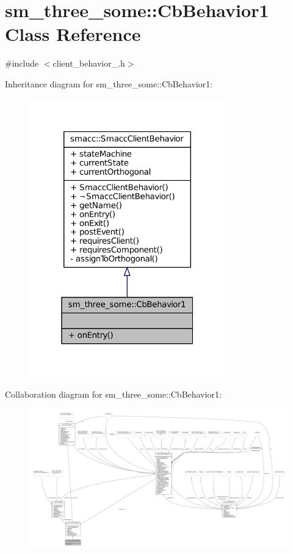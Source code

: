 \hypertarget{classsm__three__some_1_1CbBehavior1}{}\section{sm\+\_\+three\+\_\+some\+:\+:Cb\+Behavior1 Class Reference}
\label{classsm__three__some_1_1CbBehavior1}


{\ttfamily \#include $<$client\+\_\+behavior\+\_.\+h$>$}



Inheritance diagram for sm\+\_\+three\+\_\+some\+:\+:Cb\+Behavior1\+:
\nopagebreak
\begin{figure}[H]
\begin{center}
\leavevmode
\includegraphics[width=241pt]{classsm__three__some_1_1CbBehavior1__inherit__graph}
\end{center}
\end{figure}


Collaboration diagram for sm\+\_\+three\+\_\+some\+:\+:Cb\+Behavior1\+:
\nopagebreak
\begin{figure}[H]
\begin{center}
\leavevmode
\includegraphics[width=350pt]{classsm__three__some_1_1CbBehavior1__coll__graph}
\end{center}
\end{figure}
